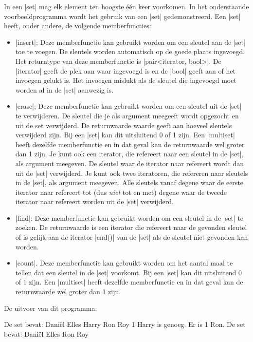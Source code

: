 \begin{cpplstShortInline}
\label{sec:set}
In een |set| mag elk element ten hoogste één keer voorkomen.
In het onderstaande voorbeeldprogramma  wordt het gebruik van een |set| gedemonstreerd.
Een |set| heeft, onder andere, de volgende memberfuncties:
\begin{itemize}
	\item |insert|; 
	Deze memberfunctie kan gebruikt worden om een sleutel aan de |set| toe te voegen.
	De sleutels worden automatisch op de goede plaats ingevoegd.
	Het returntype van deze memberfunctie is |pair<iterator, bool>|.
	De |iterator| geeft de plek aan waar ingevoegd is en de |bool| geeft aan of het invoegen gelukt is.
	Het invoegen mislukt als de sleutel die ingevoegd moet worden al in de |set| aanwezig is.
	\item |erase|;
	Deze memberfunctie kan gebruikt worden om een sleutel uit de |set| te verwijderen.
	De sleutel die je als argument meegeeft wordt opgezocht en uit de set verwijderd.
	De returnwaarde waarde geeft aan hoeveel sleutels verwijderd zijn.
	Bij een |set| kan dit uitsluitend 0 of 1 zijn.
	Een |multiset| heeft dezelfde memberfunctie en in dat geval kan de returnwaarde wel groter dan 1 zijn.
	Je kunt ook een iterator, die refereert naar een sleutel in de |set|, als argument meegeven.
	De sleutel waar de iterator naar refereert wordt dan uit de |set| verwijderd.
	Je kunt ook twee iteratoren, die refereren naar sleutels in de |set|, als argument meegeven.
	Alle sleutels vanaf degene waar de eerste iterator naar refereert tot (dus \emph{niet} tot en met) degene waar de tweede iterator naar refereert worden uit de |set| verwijderd.
	\item |find|;
	Deze memberfunctie kan gebruikt worden om een sleutel in de |set| te zoeken.
	De returnwaarde is een iterator die refereert naar de gevonden sleutel of is gelijk aan de iterator |end()| van de |set| als de sleutel niet gevonden kan worden.
	\item |count|.
	Deze memberfunctie kan gebruikt worden om het aantal maal te tellen dat een sleutel in de |set| voorkomt.
	Bij een |set| kan dit uitsluitend 0 of 1 zijn.
	Een |multiset| heeft dezelfde memberfunctie en in dat geval kan de returnwaarde wel groter dan 1 zijn.
\end{itemize}


De uitvoer van dit programma:
\begin{coutput}
De set bevat: Daniël Elles Harry Ron Roy
1 Harry is genoeg.
Er is 1 Ron.
De set bevat: Daniël Elles Ron Roy
\end{coutput}


\end{cpplstShortInline}

